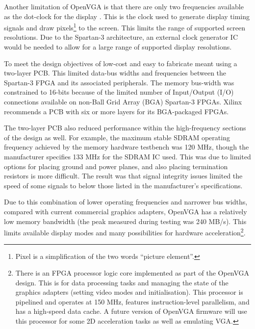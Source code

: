 Another limitation of OpenVGA is that there are only two frequencies available as
the dot-clock for the display . This is the clock used to generate display timing
signals and draw pixels\footnote{Pixel is a simplification of the two words
``picture element''.} to the screen. This limits the range of supported
screen resolutions. Due to the Spartan-3 architecture, an external clock
generator IC would be needed to allow for a large range of supported display
resolutions.

To meet the design objectives of low-cost and easy to fabricate meant using a
two-layer PCB. This limited data-bus widths and frequencies between the Spartan-3
FPGA and its associated peripherals. The memory bus-width was constrained to
16-bits because of the limited number of Input/Output (I/O) connections available on non-Ball Grid
Array (BGA) Spartan-3 FPGAs.
Xilinx recommends a PCB with six or more layers for its BGA-packaged FPGAs.

The two-layer PCB also reduced performance within the high-frequency sections of
the design as well. For example, the maximum stable SDRAM operating frequency
achieved by the memory hardware testbench was 120 MHz, though the manufacturer
specifies 133 MHz for the SDRAM IC used. This was due to limited options for
placing ground and power planes, and also placing termination resistors is more
difficult. The result was that signal integrity issues limited the speed of some
signals to below those listed in the manufacturer's specifications.

Due to this combination of lower operating frequencies and narrower bus widths,
compared with current commercial graphics adapters, OpenVGA has a relatively low
memory bandwidth (the peak measured during testing was 240 MB/s). This limits
available display modes and many possibilities for hardware
acceleration\footnote{There is an FPGA processor logic core implemented as part
of the OpenVGA design. This is for data processing tasks and managing the state
of the graphics adapters (setting video modes and initialisation). This processor
is pipelined and operates at 150 MHz, features instruction-level parallelism, and
has a high-speed data cache. A future version of OpenVGA firmware will use this
processor for some 2D acceleration tasks as well as emulating VGA.}.


